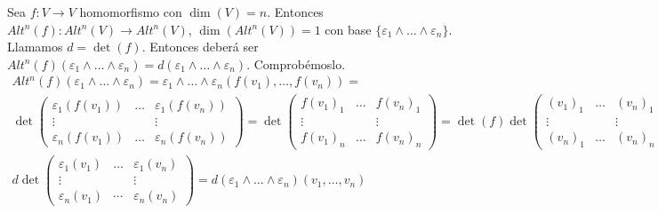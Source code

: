 \documentclass[CV.tex]{subfiles}
\begin{document}
\begin{dem}
Sea $f:V\to V$ homomorfismo con $\dim(V)=n$. Entonces $Alt^n(f):Alt^n(V)\to Alt^n(V)$, $\dim(Alt^n(V))=1$ con base $\{\varepsilon_1\land\dots\land\varepsilon_n\}$. Llamamos $d=\det(f)$. Entonces deberá ser $Alt^n(f)(\varepsilon_1\land\dots\land\varepsilon_n)=d(\varepsilon_1\land\dots\land\varepsilon_n)$. Comprobémoslo.
\begin{gather*}
Alt^n(f)(\varepsilon_1\land\dots\land\varepsilon_n)=\varepsilon_1\land\dots\land \varepsilon_n(f(v_1),\dots, f(v_n))=\\
\det\begin{pmatrix}
\varepsilon_1(f(v_1)) & \dots & \varepsilon_1(f(v_n))\\
\vdots & & \vdots\\
\varepsilon_n(f(v_1)) & \dots & \varepsilon_n(f(v_n))
\end{pmatrix}=\det\begin{pmatrix}
f(v_1)_1 & \dots & f(v_n)_1\\
\vdots & & \vdots\\
f(v_1)_n & \dots & f(v_n)_n
\end{pmatrix}=\det(f)\det\begin{pmatrix}
(v_1)_1 & \dots & (v_n)_1\\
\vdots & & \vdots\\
(v_n)_1 & \dots & (v_n)_n
\end{pmatrix}=\\d\det\begin{pmatrix}
\varepsilon_1(v_1) & \dots &\varepsilon_1(v_n)\\
\vdots & &\vdots \\
\varepsilon_n(v_1) & \cdots & \varepsilon_n(v_n)
\end{pmatrix}=d (\varepsilon_1\land\dots\land\varepsilon_n)(v_1,\dots, v_n)
\end{gather*}


\end{dem}
\end{document}
